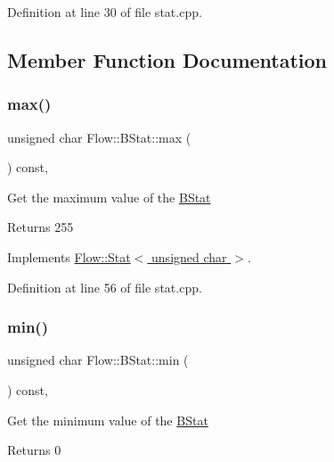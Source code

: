Definition at line 30 of file stat.\+cpp.



\subsection{Member Function Documentation}
\hypertarget{class_flow_1_1_b_stat_adcd3075bd06f64d690e66067047f0121}{}\label{class_flow_1_1_b_stat_adcd3075bd06f64d690e66067047f0121} 
\subsubsection{\texorpdfstring{max()}{max()}}
{\footnotesize\ttfamily unsigned char Flow\+::\+B\+Stat\+::max (\begin{DoxyParamCaption}{ }\end{DoxyParamCaption}) const\hspace{0.3cm}{\ttfamily [override]}, {\ttfamily [virtual]}}

Get the maximum value of the \hyperlink{class_flow_1_1_b_stat}{B\+Stat} \begin{DoxyReturn}{Returns}
255 
\end{DoxyReturn}


Implements \hyperlink{class_flow_1_1_stat_a61757491d2145c37460a1cd32a8db8bb}{Flow\+::\+Stat$<$ unsigned char $>$}.



Definition at line 56 of file stat.\+cpp.

\hypertarget{class_flow_1_1_b_stat_a815c577e96e80df05112d5e7928789c1}{}\label{class_flow_1_1_b_stat_a815c577e96e80df05112d5e7928789c1} 
\subsubsection{\texorpdfstring{min()}{min()}}
{\footnotesize\ttfamily unsigned char Flow\+::\+B\+Stat\+::min (\begin{DoxyParamCaption}{ }\end{DoxyParamCaption}) const\hspace{0.3cm}{\ttfamily [override]}, {\ttfamily [virtual]}}

Get the minimum value of the \hyperlink{class_flow_1_1_b_stat}{B\+Stat} \begin{DoxyReturn}{Returns}
0 
\end{DoxyReturn}



